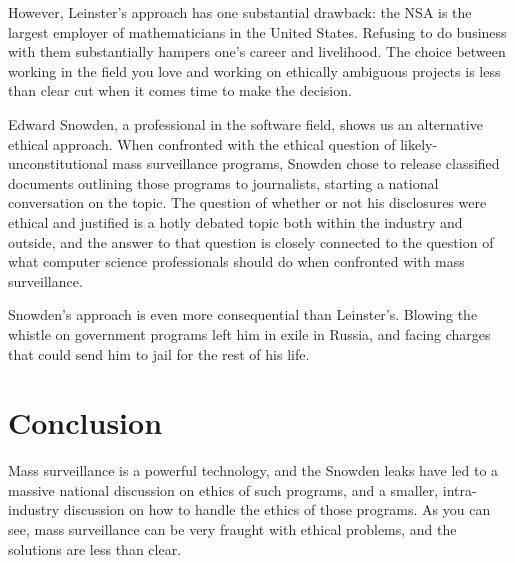\documentclass{sig-alternate-05-2015}
\begin{document}
However, Leinster's approach has one substantial drawback: the NSA is the
largest employer of mathematicians in the United States. Refusing to do
business with them substantially hampers one's career and livelihood. The
choice between working in the field you love and working on ethically ambiguous
projects is less than clear cut when it comes time to make the decision.

Edward Snowden, a professional in the software field, shows us an alternative
ethical approach. When confronted with the ethical question of 
likely-unconstitutional mass surveillance programs, Snowden chose to release
classified documents outlining those programs to journalists, starting a
national conversation on the topic. The question of whether or not his
disclosures were ethical and justified is a hotly debated topic both within the
industry and outside, and the answer to that question is closely connected to
the question of what computer science professionals should do when confronted
with mass surveillance.

Snowden's approach is even more consequential than Leinster's. Blowing the
whistle on government programs left him in exile in Russia, and facing charges
that could send him to jail for the rest of his life.

\section{Conclusion}

Mass surveillance is a powerful technology, and the Snowden leaks have led to a
massive national discussion on ethics of such programs, and a smaller,
intra-industry discussion on how to handle the ethics of those programs. As you
can see, mass surveillance can be very fraught with ethical problems, and the
solutions are less than clear.



\end{document}
